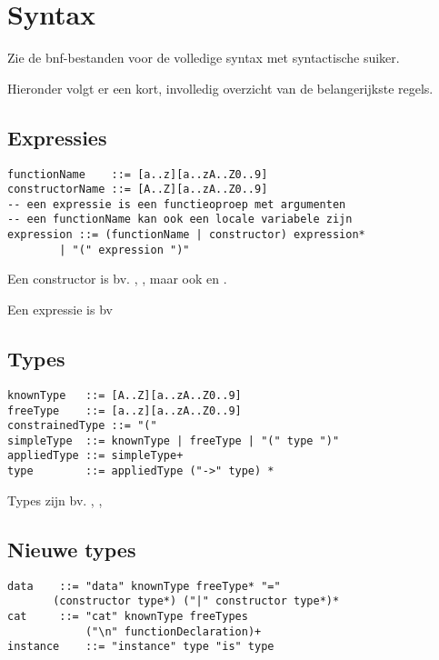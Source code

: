\section{Syntax}

Zie de bnf-bestanden voor de volledige syntax met syntactische suiker. 

Hieronder volgt er een kort, involledig overzicht van de belangerijkste regels.

\subsection{Expressies}

\begin{lstlisting}[frame=single]
functionName	::= [a..z][a..zA..Z0..9]
constructorName ::= [A..Z][a..zA..Z0..9]
-- een expressie is een functieoproep met argumenten
-- een functionName kan ook een locale variabele zijn
expression ::= (functionName | constructor) expression* 
		| "(" expression ")"
\end{lstlisting}

Een constructor is bv. , , maar ook  en
.

Een expressie is bv 

\subsection{Types}
\begin{lstlisting}[frame=single]
knownType	::= [A..Z][a..zA..Z0..9]
freeType	::= [a..z][a..zA..Z0..9]
constrainedType	::= "("
simpleType	::= knownType | freeType | "(" type ")" 
appliedType	::= simpleType+	 
type		::= appliedType ("->" type) *
\end{lstlisting}

Types zijn bv. , , 

\subsection{Nieuwe types}

\begin{lstlisting}[frame=single]
data	::= "data" knownType freeType* "=" 
	   (constructor type*) ("|" constructor type*)*
cat		::= "cat" knownType freeTypes 
			("\n" functionDeclaration)+
instance	::= "instance" type "is" type
\end{lstlisting}

